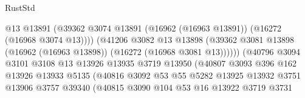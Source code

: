 \begin{lexlean}{RustStd}
\begin{coremodule}
                                            @13
                                            @13891
                                            (@39362
                                              @3074
                                              @13891
                                              (@16962 (@16963 @13891))
                                              (@16272 (@16968 @3074 @13))))
                                          (@41206
                                            @3082
                                            @13
                                            @13898
                                            (@39362
                                              @3081
                                              @13898
                                              (@16962 (@16963 @13898))
                                              (@16272 (@16968 @3081 @13))))))
                                      (@40796
                                        @3094
                                        @3101
                                        @3108
                                        @13
                                        @13926
                                        @13935
                                        @3719
                                        @13950
                                        (@40807
                                          @3093
                                          @396
                                          @162
                                          @13926
                                          @13933
                                          @5135
                                          (@40816
                                            @3092
                                            @53
                                            @55
                                            @5282
                                            @13925
                                            @13932
                                            @3751
                                            @13906
                                            @3757
                                            @39340
                                            (@40815
                                              @3090
                                              @104
                                              @53
                                              @16
                                              @13922
                                              @3719
                                              @3731

\end{coremodule}
\end{lexlean}
